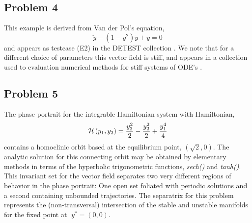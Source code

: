 \subsection{Problem 4}

\noindent  This example is derived from Van der Pol's equation, 
\[
   \ddot{y} - \left ( 1-y^2 \right ) \dot{y} + y = 0
\]
and appears as testcase (E2) in the DETEST collection \cite{hull1}.  We note that for a
different choice of parameters this vector field is stiff, and appears in a collection
used to evaluation numerical methods for stiff systems of ODE's \cite{enright1}.  


\medskip
\begin{center}
\end{center}
\medskip


\subsection{Problem 5}

\noindent  The phase portrait for the integrable Hamiltonian system with Hamiltonian, 
\[
     {\cal H}\left ( y_1,y_2 \right ) = { y_2^2 \over 2 } - { y_2^2 \over 2 } +  { y_1^4 \over 4 }
\]
contains a homoclinic orbit based at the equilibrium point, $(\sqrt{2},0)$.  The analytic 
solution for this connecting orbit may be obtained by elementary methods in terms of
the hyperbolic trigonometric  functions, {\em sech()} and {\em tanh()}.   This invariant 
set for the vector field separates two very different regions of behavior in the phase
portrait: One open set foliated with periodic solutions and a second containing 
unbounded trajectories.  The separatrix for this problem represents the (non-transversal)
intersection of the stable and unstable manifolds for the fixed point at $\; y^* \! = \! (0,0)$.
\medskip

